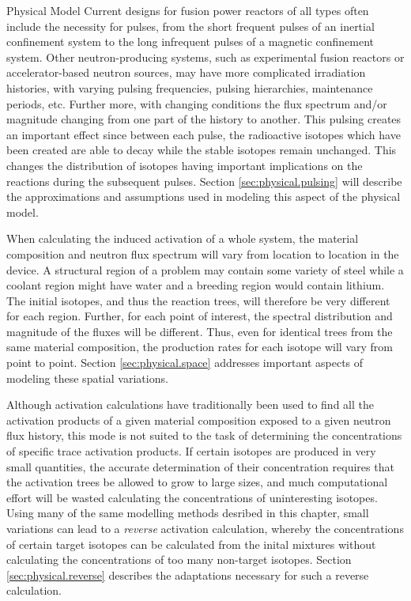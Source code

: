 \begin{chapter}{Physical Model\label{chap:physical}}
Current designs for fusion power reactors of all types often include
the necessity for pulses, from the short frequent pulses of an
inertial confinement system to the long infrequent pulses of a
magnetic confinement system.  Other neutron-producing systems, such as
experimental fusion reactors or accelerator-based neutron sources, may
have more complicated irradiation histories, with varying pulsing
frequencies, pulsing hierarchies, maintenance periods, etc.  Further
more, with changing conditions the flux spectrum and/or magnitude
changing from one part of the history to another.  This pulsing
creates an important
effect\cite{ref:Pulsar,ref:spangler,ref:spanglerMS} since between each
pulse, the radioactive isotopes which have been created are able to
decay while the stable isotopes remain unchanged.  This changes the
distribution of isotopes having important implications on the
reactions during the subsequent pulses.  Section
\ref{sec:physical.pulsing} will describe the approximations and
assumptions used in modeling this aspect of the physical model.

When calculating the induced activation of a whole system, the
material composition and neutron flux spectrum will vary from location
to location in the device.  A structural region of a problem may
contain some variety of steel while a coolant region might have water
and a breeding region would contain lithium.  The initial isotopes,
and thus the reaction trees, will therefore be very different for each
region.  Further, for each point of interest, the spectral
distribution and magnitude of the fluxes will be different.  Thus,
even for identical trees from the same material composition, the
production rates for each isotope will vary from point to point.
Section \ref{sec:physical.space} addresses important aspects of
modeling these spatial variations.

Although activation calculations have traditionally been used to find
all the activation products of a given material composition exposed to
a given neutron flux history, this mode is not suited to the task of
determining the concentrations of specific trace activation products.
If certain isotopes are produced in very small quantities, the
accurate determination of their concentration requires that the
activation trees be allowed to grow to large sizes, and much
computational effort will be wasted calculating the concentrations of
uninteresting isotopes.  Using many of the same modelling methods
desribed in this chapter, small variations can lead to a
\textsl{reverse} activation calculation, whereby the concentrations of
certain target isotopes can be calculated from the inital mixtures
without calculating the concentrations of too many non-target
isotopes.  Section \ref{sec:physical.reverse} describes the
adaptations necessary for such a reverse calculation.


\end{chapter}
